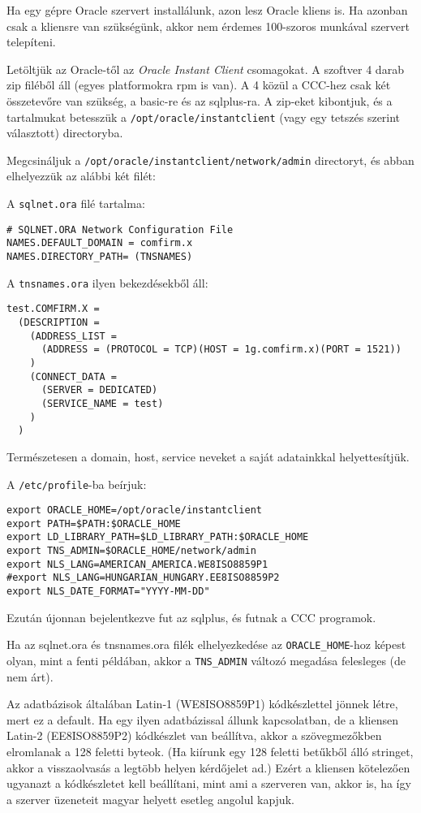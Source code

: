 Ha egy gépre Oracle szervert installálunk, azon 
lesz  Oracle kliens is. Ha azonban csak a kliensre van szükségünk,
akkor nem érdemes 100-szoros munkával szervert telepíteni.

Letöltjük az Oracle-től az {\em Oracle Instant Client\/} csomagokat.
A szoftver 4 darab zip filéből áll (egyes platformokra rpm is van).
A 4 közül a CCC-hez csak két összetevőre van szükség, a basic-re 
és az sqlplus-ra. A zip-eket kibontjuk, és a tartalmukat betesszük
a \verb!/opt/oracle/instantclient! (vagy egy tetszés szerint választott) 
directoryba.

Megcsináljuk a \verb!/opt/oracle/instantclient/network/admin!
directoryt, és abban elhelyezzük az alábbi két filét:

A \verb!sqlnet.ora! filé tartalma:
\begin{verbatim}
# SQLNET.ORA Network Configuration File
NAMES.DEFAULT_DOMAIN = comfirm.x
NAMES.DIRECTORY_PATH= (TNSNAMES)
\end{verbatim}

A \verb!tnsnames.ora! ilyen bekezdésekből áll:
\begin{verbatim}
test.COMFIRM.X =
  (DESCRIPTION =
    (ADDRESS_LIST =
      (ADDRESS = (PROTOCOL = TCP)(HOST = 1g.comfirm.x)(PORT = 1521))
    )
    (CONNECT_DATA =
      (SERVER = DEDICATED)
      (SERVICE_NAME = test)
    )
  )
\end{verbatim}
Természetesen a domain, host, service neveket a saját adatainkkal
helyettesítjük.

A \verb!/etc/profile!-ba beírjuk:
\begin{verbatim}
export ORACLE_HOME=/opt/oracle/instantclient
export PATH=$PATH:$ORACLE_HOME
export LD_LIBRARY_PATH=$LD_LIBRARY_PATH:$ORACLE_HOME
export TNS_ADMIN=$ORACLE_HOME/network/admin
export NLS_LANG=AMERICAN_AMERICA.WE8ISO8859P1
#export NLS_LANG=HUNGARIAN_HUNGARY.EE8ISO8859P2
export NLS_DATE_FORMAT="YYYY-MM-DD"
\end{verbatim}
Ezután újonnan bejelentkezve fut az sqlplus, és futnak a CCC programok.

Ha az sqlnet.ora és tnsnames.ora filék elhelyezkedése
az \verb!ORACLE_HOME!-hoz képest olyan, mint a fenti példában,
akkor a \verb!TNS_ADMIN! változó megadása felesleges (de nem árt).

Az adatbázisok általában Latin-1 (WE8ISO8859P1) kódkészlettel 
jönnek létre, mert ez a default. Ha egy ilyen adatbázissal állunk
kapcsolatban, de a kliensen Latin-2 (EE8ISO8859P2) kódkészlet van beállítva,
akkor a szövegmezőkben elromlanak a 128 feletti byteok.
(Ha kiírunk egy 128 feletti betűkből álló stringet, 
akkor a  visszaolvasás a legtöbb helyen kérdőjelet ad.)
Ezért a kliensen kötelezően ugyanazt a kódkészletet
kell beállítani, mint ami a szerveren van, akkor is, ha így
a szerver üzeneteit magyar helyett esetleg angolul kapjuk.





